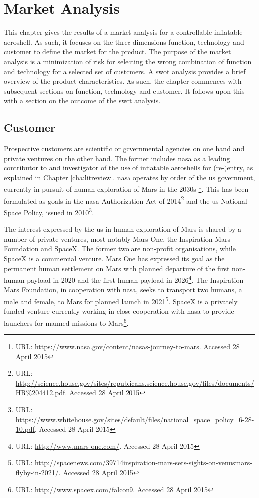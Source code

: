 \section{Market Analysis} \label{ch:market}
This chapter gives the results of a market analysis for a controllable inflatable aeroshell. As such, it focuses on the three dimensions function, technology and customer to define the market for the product. The purpose of the market analysis is a minimization of risk for selecting the wrong combination of function and technology for a selected set of customers. A \gls{swot} analysis provides a brief overview of the product characteristics. As such, the chapter commences with subsequent sections on function, technology and customer. It follows upon this with a section on the outcome of the \gls{swot} analysis.

\subsection{Customer}
Prospective customers are scientific or governmental agencies on one hand and private ventures on the other hand. The former includes \gls{nasa} as a leading contributor to and investigator of the use of inflatable aeroshells for (re-)entry, as explained in Chapter \ref{cha:litreview}. \gls{nasa} operates by order of the \gls{us} government, currently in pursuit of human exploration of Mars in the 2030s \footnote{URL: \url{https://www.nasa.gov/content/nasas-journey-to-mars}.  Accessed 28 April 2015}. This has been formulated as goals in the \gls{nasa} Authorization Act of 2014\footnote{URL: \url{http://science.house.gov/sites/republicans.science.house.gov/files/documents/HR\%204412.pdf}. Accessed 28 April 2015} and the \gls{us} National Space Policy, issued in 2010\footnote{URL: \url{https://www.whitehouse.gov/sites/default/files/national\_space\_policy\_6-28-10.pdf}. Accessed 28 April 2015}.

The interest expressed by the \gls{us} in human exploration of Mars is shared by a number of private ventures, most notably Mars One, the Inspiration Mars Foundation and SpaceX. The former two are non-profit organisations, while SpaceX is a commercial venture. Mars One has expressed its goal as the permanent human settlement on Mars with planned departure of the first non-human payload in 2020 and the first human payload in 2026\footnote{URL: \url{http://www.mars-one.com/}. Accessed 28 April 2015}. The Inspiration Mars Foundation, in cooperation with \gls{nasa}, seeks to transport two humans, a male and female, to Mars for planned launch in 2021\footnote{URL: \url{http://spacenews.com/39714inspiration-mars-sets-sights-on-venusmars-flyby-in-2021/}. Accessed 28 April 2015}. SpaceX is a privately funded venture currently working in close cooperation with \gls{nasa} to provide launchers for manned missions to Mars\footnote{URL: \url{http://www.spacex.com/falcon9}. Accessed 28 April 2015}.

